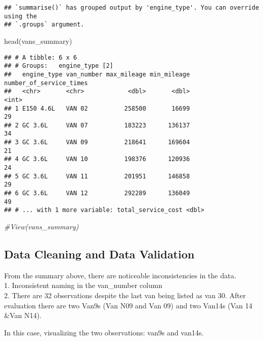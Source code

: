 \documentclass[
]{article}
\newenvironment{Shaded}{\begin{snugshade}}{\end{snugshade}}
\newcommand{\CommentTok}[1]{\textcolor[rgb]{0.56,0.35,0.01}{\textit{#1}}}
\newcommand{\FunctionTok}[1]{\textcolor[rgb]{0.00,0.00,0.00}{#1}}
\newcommand{\NormalTok}[1]{#1}
\begin{document}
\begin{verbatim}
## `summarise()` has grouped output by 'engine_type'. You can override using the
## `.groups` argument.
\end{verbatim}

\begin{Shaded}
\begin{Highlighting}[]
\FunctionTok{head}\NormalTok{(vans\_summary)}
\end{Highlighting}
\end{Shaded}

\begin{verbatim}
## # A tibble: 6 x 6
## # Groups:   engine_type [2]
##   engine_type van_number max_mileage min_mileage number_of_service_times
##   <chr>       <chr>            <dbl>       <dbl>                   <int>
## 1 E150 4.6L   VAN 02          258500       16699                      29
## 2 GC 3.6L     VAN 07          183223      136137                      34
## 3 GC 3.6L     VAN 09          218641      169604                      21
## 4 GC 3.6L     VAN 10          198376      120936                      24
## 5 GC 3.6L     VAN 11          201951      146858                      29
## 6 GC 3.6L     VAN 12          292289      136049                      49
## # ... with 1 more variable: total_service_cost <dbl>
\end{verbatim}

\begin{Shaded}
\begin{Highlighting}[]
\CommentTok{\#View(vans\_summary)}
\end{Highlighting}
\end{Shaded}

\hypertarget{data-cleaning-and-data-validation}{%
\subsection{Data Cleaning and Data
Validation}\label{data-cleaning-and-data-validation}}

From the summary above, there are noticeable inconsistencies in the
data.\\
1. Inconsistent naming in the van\_number column\\
2. There are 32 observations despite the last van being listed as van
30. After evaluation there are two Van9s (Van N09 and Van 09) and two
Van14s (Van 14 \&Van N14).

In this case, visualizing the two observations: van9s and van14s.
\end{document}
